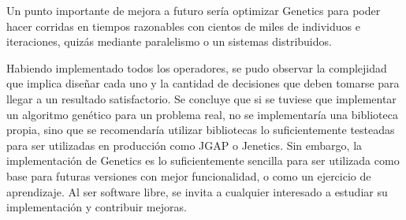 \documentclass{conaiisi}
\begin{document}
\begin{multicols}{2}
{Un punto importante de mejora a futuro sería optimizar Genetics para poder hacer corridas en tiempos razonables con cientos de miles de individuos e iteraciones, quizás mediante paralelismo o un sistemas distribuidos.

Habiendo implementado todos los operadores, se pudo observar la complejidad que implica diseñar cada uno y la cantidad de decisiones que deben tomarse para llegar a un resultado satisfactorio.
Se concluye que si se tuviese que implementar un algoritmo genético para un problema real, no se implementaría una biblioteca propia, sino que se recomendaría utilizar bibliotecas lo suficientemente testeadas para ser utilizadas en producción como JGAP\cite{jgap} o Jenetics\cite{jenetics}.
Sin embargo, la implementación de Genetics es lo suficientemente sencilla para ser utilizada como base para futuras versiones con mejor funcionalidad, o como un ejercicio de aprendizaje.
Al ser software libre, se invita a cualquier interesado a estudiar su implementación y contribuir mejoras.

}



\textup{
\printbibliography[heading=subbibintoc]
}
\end{multicols}
\end{document}
